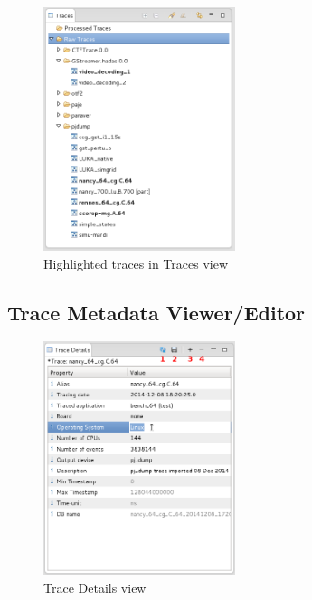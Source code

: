\documentclass[twoside]{article}
\begin{document}
\begin{sloppypar}
\begin{figure}[h!]
  \centering
    \includegraphics[width=0.5\textwidth]{images/trace_browser_highlight.png}
  \caption{Highlighted traces in Traces view}
  \label{fig:highlight}
\end{figure}

\subsection{Trace Metadata Viewer/Editor}
\label{subsec:metadata}

\begin{figure}[h!]
  \centering
    \includegraphics[width=0.5\textwidth]{images/metadata_editing.png}
  \caption{Trace Details view}
  \label{fig:metadata_editing}
\end{figure}


\end{sloppypar}
\end{document}

